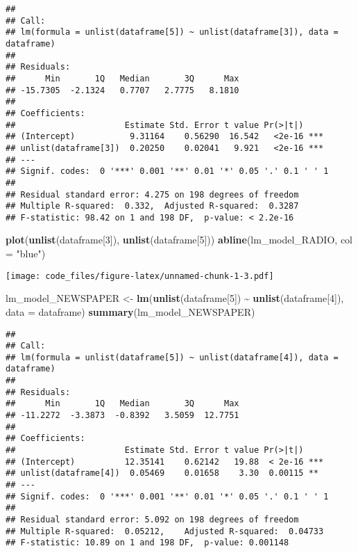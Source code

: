 \documentclass[
]{article}
\newenvironment{Shaded}{\begin{snugshade}}{\end{snugshade}}
\newcommand{\AttributeTok}[1]{\textcolor[rgb]{0.13,0.29,0.53}{#1}}
\newcommand{\DecValTok}[1]{\textcolor[rgb]{0.00,0.00,0.81}{#1}}
\newcommand{\FunctionTok}[1]{\textcolor[rgb]{0.13,0.29,0.53}{\textbf{#1}}}
\newcommand{\NormalTok}[1]{#1}
\newcommand{\OtherTok}[1]{\textcolor[rgb]{0.56,0.35,0.01}{#1}}
\newcommand{\SpecialCharTok}[1]{\textcolor[rgb]{0.81,0.36,0.00}{\textbf{#1}}}
\newcommand{\StringTok}[1]{\textcolor[rgb]{0.31,0.60,0.02}{#1}}
\begin{document}
\begin{verbatim}
## 
## Call:
## lm(formula = unlist(dataframe[5]) ~ unlist(dataframe[3]), data = dataframe)
## 
## Residuals:
##      Min       1Q   Median       3Q      Max 
## -15.7305  -2.1324   0.7707   2.7775   8.1810 
## 
## Coefficients:
##                      Estimate Std. Error t value Pr(>|t|)    
## (Intercept)           9.31164    0.56290  16.542   <2e-16 ***
## unlist(dataframe[3])  0.20250    0.02041   9.921   <2e-16 ***
## ---
## Signif. codes:  0 '***' 0.001 '**' 0.01 '*' 0.05 '.' 0.1 ' ' 1
## 
## Residual standard error: 4.275 on 198 degrees of freedom
## Multiple R-squared:  0.332,  Adjusted R-squared:  0.3287 
## F-statistic: 98.42 on 1 and 198 DF,  p-value: < 2.2e-16
\end{verbatim}

\begin{Shaded}
\begin{Highlighting}[]
\FunctionTok{plot}\NormalTok{(}\FunctionTok{unlist}\NormalTok{(dataframe[}\DecValTok{3}\NormalTok{]), }\FunctionTok{unlist}\NormalTok{(dataframe[}\DecValTok{5}\NormalTok{]))}
\FunctionTok{abline}\NormalTok{(lm\_model\_RADIO, }\AttributeTok{col =} \StringTok{"blue"}\NormalTok{)}
\end{Highlighting}
\end{Shaded}

\texttt{[image: code\_files/figure-latex/unnamed-chunk-1-3.pdf]}

\begin{Shaded}
\begin{Highlighting}[]
\NormalTok{lm\_model\_NEWSPAPER }\OtherTok{\textless{}{-}} \FunctionTok{lm}\NormalTok{(}\FunctionTok{unlist}\NormalTok{(dataframe[}\DecValTok{5}\NormalTok{]) }\SpecialCharTok{\textasciitilde{}} \FunctionTok{unlist}\NormalTok{(dataframe[}\DecValTok{4}\NormalTok{]), }\AttributeTok{data =}\NormalTok{ dataframe)}
\FunctionTok{summary}\NormalTok{(lm\_model\_NEWSPAPER)}
\end{Highlighting}
\end{Shaded}

\begin{verbatim}
## 
## Call:
## lm(formula = unlist(dataframe[5]) ~ unlist(dataframe[4]), data = dataframe)
## 
## Residuals:
##      Min       1Q   Median       3Q      Max 
## -11.2272  -3.3873  -0.8392   3.5059  12.7751 
## 
## Coefficients:
##                      Estimate Std. Error t value Pr(>|t|)    
## (Intercept)          12.35141    0.62142   19.88  < 2e-16 ***
## unlist(dataframe[4])  0.05469    0.01658    3.30  0.00115 ** 
## ---
## Signif. codes:  0 '***' 0.001 '**' 0.01 '*' 0.05 '.' 0.1 ' ' 1
## 
## Residual standard error: 5.092 on 198 degrees of freedom
## Multiple R-squared:  0.05212,    Adjusted R-squared:  0.04733 
## F-statistic: 10.89 on 1 and 198 DF,  p-value: 0.001148
\end{verbatim}
\end{document}

